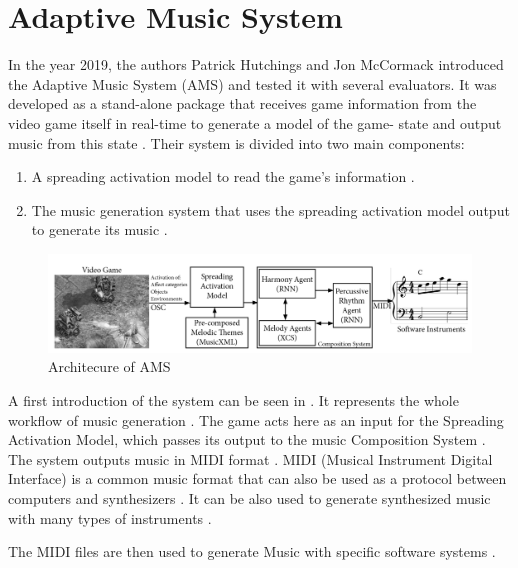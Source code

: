 \section{Adaptive Music System}

In the year 2019, the authors Patrick Hutchings and Jon McCormack
introduced the Adaptive Music System (AMS) \cite{hutMcCormAms} 
and tested it with several evaluators. It was developed as a
stand-alone package that receives game information from the
video game itself in real-time to generate a model of the game-
state and output music from this state \cite{hutMcCormAms}.
Their system is divided into two main components: 
\begin{enumerate}[label=\arabic*)]
    \item A spreading activation model to read the game's information \cite{hutMcCormAms}.
    \item The music generation system that uses the spreading activation model output to generate its music \cite{hutMcCormAms}. 
\end{enumerate}

\begin{figure}[h]
    \centering
    \includegraphics[width=\linewidth]{images/ams_architecture.png}
    \caption{Architecure of AMS \cite{hutMcCormAms}}
    \label{fig:ams_architecture}
\end{figure}

A first introduction of the system can be seen in .
It represents the whole workflow of music generation \cite{hutMcCormAms}. The game 
acts here as an input for the Spreading Activation Model, which passes its output
to the music Composition System \cite{hutMcCormAms}. The system outputs music in
MIDI format \cite{hutMcCormAms}. MIDI (Musical Instrument Digital Interface) is a
common music format \cite{midi_explanation} that can also be used as a protocol
between computers and synthesizers \cite{midi_explanation}. It can be also used to 
generate synthesized music \cite{midi_explanation} with many types of instruments \cite{midi_general}.

The MIDI files are then used to generate Music with specific software systems \cite{hutMcCormAms}.



